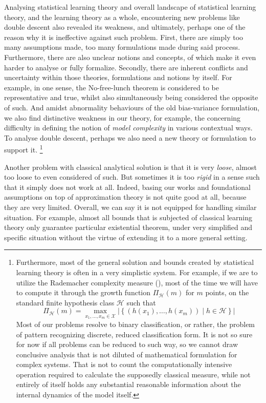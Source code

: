 Analysing statistical learning theory and overall landscape of statistical learning theory, and the learning theory as a whole, encountering new problems like double descent also revealed its weakness, and ultimately, perhaps one of the reason why it is ineffective against such problem. First, there are simply too many assumptions made, too many formulations made during said process. Furthermore, there are also unclear notions and concepts, of which make it even harder to analyse or fully formalize. Secondly, there are inherent conflicts and uncertainty within those theories, formulations and notions by itself. For example, in one sense, the No-free-lunch theorem is considered to be representative and true, whilst also simultaneously being considered the opposite of such. And amidst abnormality behaviours of the old bias-variance formulation, we also find distinctive weakness in our theory, for example, the concerning difficulty in defining the notion of \textit{model complexity} in various contextual ways. To analyse double descent, perhaps we also need a new theory or formulation to support it. \footnote{Furthermore, most of the general solution and bounds created by statistical learning theory is often in a very simplistic system. For example, if we are to utilize the Rademacher complexity measure (\cite{10.5555/2371238}), most of the time we will have to compute it through the growth function $\Pi_{\mathcal{H}}(m)$ for $m$ points, on the standard finite hypothesis class $\mathcal{H}$ such that 
\begin{equation}
    \Pi_{\mathcal{H}}(m) = \max_{x_1, \dots, x_m \in \mathcal{X}} \left| \left\{ (h(x_1), \dots, h(x_m)) \mid h \in \mathcal{H} \right\} \right|
\end{equation}
Most of our problems resolve to binary classification, or rather, the problem of pattern recognizing discrete, reduced classification form. It is not so sure for now if all problems can be reduced to such way, so we cannot draw conclusive analysis that is not diluted of mathematical formulation for complex systems. That is not to count the computationally intensive operation required to calculate the supposedly classical measure, while not entirely of itself holds any substantial reasonable information about the internal dynamics of the model itself. }

Another problem with classical analytical solution is that it is very \textit{loose}, almost too loose to even considered of such. But sometimes it is too \textit{rigid} in a sense such that it simply does not work at all. Indeed, basing our works and foundational assumptions on top of approximation theory is not quite good at all, because they are very limited. Overall, we can say it is not equipped for handling similar situation. For example, almost all bounds that is subjected of classical learning theory only guarantee particular existential theorem, under very simplified and specific situation without the virtue of extending it to a more general setting. 


